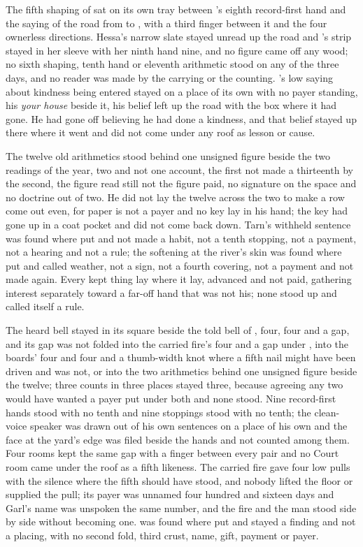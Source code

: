 The fifth shaping of  sat on its own tray between 's eighth record-first hand and the saying of the road from  to , with a third finger between it and the four ownerless directions. Hessa's narrow slate stayed unread up the road and 's strip stayed in her sleeve with her ninth hand nine, and no figure came off any wood; no sixth shaping, tenth hand or eleventh arithmetic stood on any of the three days, and no reader was made by the carrying or the counting. 's low saying about kindness being entered stayed on a place of its own with no payer standing, his \emph{your house} beside it, his belief left up the road with the box where it had gone. He had gone off believing he had done a kindness, and that belief stayed up there where it went and did not come under any roof as lesson or cause.

The twelve old arithmetics stood behind one unsigned figure beside the two readings of the year, two and not one account, the first not made a thirteenth by the second, the figure read still not the figure paid, no signature on the space and no doctrine out of two. He did not lay the twelve across the two to make a row come out even, for paper is not a payer and no key lay in his hand; the key had gone up in a coat pocket and did not come back down. Tarn's withheld sentence was found where put and not made a habit, not a tenth stopping, not a payment, not a hearing and not a rule; the softening at the river's skin was found where put and called weather, not a sign, not a fourth covering, not a payment and not made again. Every kept thing lay where it lay, advanced and not paid, gathering interest separately toward a far-off hand that was not his; none stood up and called itself a rule.

The heard bell stayed in its square beside the told bell of , four, four and a gap, and its gap was not folded into the carried fire's four and a gap under , into the boards' four and four and a thumb-width knot where a fifth nail might have been driven and was not, or into the two arithmetics behind one unsigned figure beside the twelve; three counts in three places stayed three, because agreeing any two would have wanted a payer put under both and none stood. Nine record-first hands stood with no tenth and nine stoppings stood with no tenth; the clean-voice speaker was drawn out of his own sentences on a place of his own and the face at the yard's edge was filed beside the hands and not counted among them. Four rooms kept the same gap with a finger between every pair and no Court room came under the roof as a fifth likeness. The carried fire gave four low pulls with the silence where the fifth should have stood, and nobody lifted the floor or supplied the pull; its payer was unnamed four hundred and sixteen days and Garl's name was unspoken the same number, and the fire and the man stood side by side without becoming one.  was found where put and stayed a finding and not a placing, with no second fold, third crust, name, gift, payment or payer.

